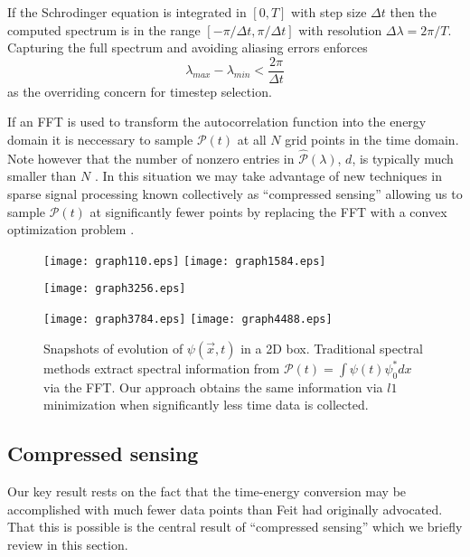 \documentclass[11pt]{amsart}
\theoremstyle{remark}
\begin{document}
If the Schrodinger equation is integrated in $[0,T]$ with step size $\Delta t$ then the computed spectrum is in the range $[-\pi / \Delta t, \pi / \Delta t]$ with resolution $\Delta \lambda = 2\pi/T$. Capturing the full spectrum and avoiding aliasing errors enforces 
\begin{equation}
\lambda_{max} - \lambda_{min} < \frac{2\pi}{\Delta t}
\end{equation}
as the overriding concern for timestep selection.

If an FFT is used to transform the autocorrelation function into the energy domain it is neccessary to sample $\mathcal{P}(t)$ at all $N$ grid points in the time domain. Note however that the number of nonzero entries in $\hat{\mathcal{P}}(\lambda)$, $d$, is typically much smaller than $N$ \cite{Chen1996}. In this situation we may take advantage of new techniques in sparse signal processing known collectively as ``compressed sensing'' allowing us to sample $\mathcal{P}(t)$ at significantly fewer points by replacing the FFT with a convex optimization problem \cite{Candes2005}.

\begin{figure}
\begin{center}
\texttt{[image: graph110.eps]}
\texttt{[image: graph1584.eps]}


\texttt{[image: graph3256.eps]}


\texttt{[image: graph3784.eps]}
\texttt{[image: graph4488.eps]}
\caption{Snapshots of evolution of $\psi(\vec{x},t)$ in a 2D box. Traditional spectral methods extract spectral information from $\mathcal{P}(t) = \int \psi(t)\psi_0^*dx$ via the FFT. Our approach obtains the same information via $l1$ minimization when significantly less time data is collected.}
\end{center}
\end{figure}

\subsection{Compressed sensing}

Our key result rests on the fact that the time-energy conversion may be accomplished with much fewer data points than Feit had originally advocated. That this is possible is the central result of ``compressed sensing'' \cite{Candes.2006} which we briefly review in this section.
\end{document}
